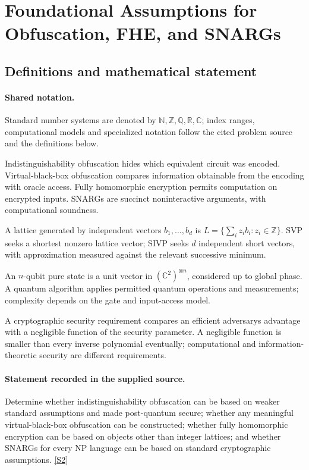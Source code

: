 \documentclass[11pt]{article}
\newcommand{\sref}[2]{\hyperlink{source:#1:#2}{[S#2]}}
\begin{document}
\section{Foundational Assumptions for Obfuscation, FHE, and SNARGs}\label{statement}

\subsection{Definitions and mathematical statement}

\paragraph{Shared notation.}Standard number systems are denoted by $\mathbb N,\mathbb Z,\mathbb Q,\mathbb R,\mathbb C$; index ranges, computational models and specialized notation follow the cited problem source and the definitions below.


Indistinguishability obfuscation hides which equivalent circuit was encoded. Virtual-black-box obfuscation compares information obtainable from the encoding with oracle access. Fully homomorphic encryption permits computation on encrypted inputs. SNARGs are succinct noninteractive arguments, with computational soundness.

A lattice generated by independent vectors $b_1,\ldots,b_d$ is $L=\{\sum_i z_i b_i:z_i\in\mathbb Z\}$. SVP seeks a shortest nonzero lattice vector; SIVP seeks $d$ independent short vectors, with approximation measured against the relevant successive minimum.

An $n$-qubit pure state is a unit vector in $(\mathbb C^2)^{\otimes n}$, considered up to global phase. A quantum algorithm applies permitted quantum operations and measurements; complexity depends on the gate and input-access model.

A cryptographic security requirement compares an efficient adversary\textquotesingle s advantage with a negligible function of the security parameter. A negligible function is smaller than every inverse polynomial eventually; computational and information-theoretic security are different requirements.
\paragraph{Statement recorded in the supplied source.}
Determine whether indistinguishability obfuscation can be based on weaker standard assumptions and made post-quantum secure; whether any meaningful virtual-black-box obfuscation can be constructed; whether fully homomorphic encryption can be based on objects other than integer lattices; and whether SNARGs for every NP language can be based on standard cryptographic assumptions. \sref{statement}{2}
\end{document}
